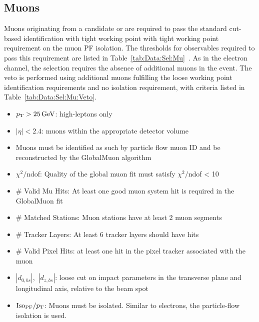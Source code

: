 


\subsection{Muons}\label{ch:IdIso:Mu}
Muons originating from a candidate \Wpm or \Z are required to pass the standard cut-based identification with tight working point with tight working point requirement on the muon PF isolation. The thresholds for observables required to pass this requirement are listed in Table~\ref{tab:Data:Sel:Mu}~\cite{MuonIDIsoCuts}. As in the electron channel, the \Wpm selection requires the absence of additional muons in the event. The veto is performed using additional muons fulfilling the loose working point identification requirements and no isolation requirement, with criteria listed in Table~\ref{tab:Data:Sel:Mu:Veto}. 
\begin{itemize}
    \item $p_{\mathrm{T}} > 25 \,\text{Ge\hspace{-.08em}V}$: high-\pt leptons only
    \item $|\eta| < 2.4$: muons within the appropriate detector volume
    \item Muons must be identified as such by particle flow muon ID and be reconstructed by the GlobalMuon algorithm
    \item $\chi^2/$ndof: Quality of the global muon fit must satisfy $\chi^2/$ndof < 10
    \item \# Valid Mu Hits: At least one good muon system hit is required in the GlobalMuon fit
    \item \# Matched Stations: Muon stations have at least 2 muon segments
    \item \# Tracker Layers: At least 6 tracker layers should have hits
    \item \# Valid Pixel Hits: at least one hit in the pixel tracker associated with the muon
    \item $|d_{0,bs}|$,~$|d_{z,bs}|$: loose cut on impact parameters in the transverse plane and longitudinal axis, relative to the beam spot 
    \item $\mathrm{Iso_{PF}}/p_{\mathrm{T}}$: Muons must be isolated. Similar to electrons, the particle-flow isolation is used. 
\end{itemize}





